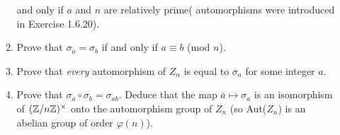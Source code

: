 \begin{enumerate}
\begin{enumerate}
                           and only if $a$ and $n$ are relatively prime(
                           automorphisms were introduced in Exercise 1.6.20).
                     \item Prove that $\sigma_a = \sigma_b$ if and only if
                           $a \equiv b$ (mod $n$).
                     \item Prove that \textit{every} automorphism of $Z_n$ is
                           equal to $\sigma_a$ for some integer $a$.
                     \item Prove that $\sigma_a\circ\sigma_b=\sigma_{ab}$.
                           Deduce that the map $\overline{a} \mapsto \sigma_a$
                           is an isomorphism of $(\mathbb{Z}/n\mathbb{Z})^\times$ onto the
                           automorphism group of $Z_n$ (so Aut($Z_n$) is an
                           abelian group of order $\varphi(n)$).
                  \end{enumerate}
\end{enumerate}

































